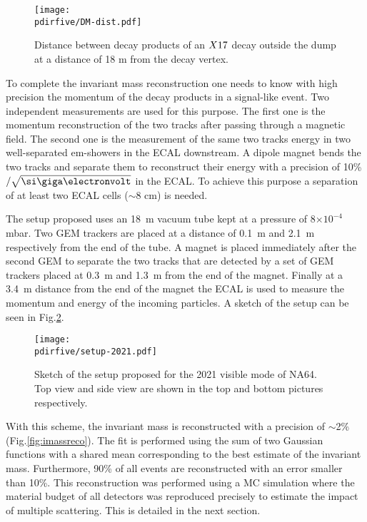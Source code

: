 \begin{figure}[tbh!]
  \centering
  \texttt{[image: \\pdirfive/DM-dist.pdf]}
  \caption[Distance of the decay products of X17 in the 2021 setup]{Distance between decay products of an $X17$ decay outside the dump at a distance of 18 m from the decay vertex.}
  \label{fig:dm_dist1}
\end{figure}

To complete the invariant mass reconstruction one needs to know with high precision the momentum of the decay products in a signal-like event. Two independent measurements are used for this purpose. The first one is the momentum reconstruction of the two tracks after passing through a magnetic field. The second one is the measurement of the same two tracks energy in two well-separated em-showers in the ECAL downstream. A dipole magnet bends the two tracks and separate them to reconstruct their energy with a precision of 10\%$/\sqrt{\gev}$ in the ECAL. To achieve this purpose a separation of at least two ECAL cells ($\sim 8$ \si{\centi\meter}) is needed.

The setup proposed uses an \SI{18}{\meter} vacuum tube kept at a pressure of 8$\times 10^{-4}$ \si{\milli\bar}. Two GEM trackers \cite{gem} are placed at a distance of \SI{0.1}{\meter} and \SI{2.1}{\meter} respectively from the end of the tube. A magnet is placed immediately after the second GEM to separate the two tracks that are detected by a set of GEM trackers placed at \SI{0.3}{\meter} and \SI{1.3}{\meter} from the end of the magnet. Finally at a \SI{3.4}{\meter} distance from the end of the magnet the ECAL is used to measure the momentum and energy of the incoming particles. A sketch of the setup can be seen in Fig.\ref{fig:setup-2021}.

\begin{figure}[tbh!]
  \centering
  \texttt{[image: \\pdirfive/setup-2021.pdf]}
  \caption[2021 setup]{Sketch of the setup proposed for the 2021 visible mode of NA64. Top view and side view are shown in the top and bottom pictures respectively.}
  \label{fig:setup-2021}
\end{figure}

With this scheme, the invariant mass is reconstructed with a precision of $\sim$2\% (Fig.\ref{fig:imassreco}). The fit is performed using the sum of two Gaussian functions with a shared mean corresponding to the best estimate of the invariant mass. Furthermore, 90\% of all events are reconstructed with an error smaller than 10\%. This reconstruction was performed using a MC simulation where the material budget of all detectors was reproduced precisely to estimate the impact of multiple scattering. This is detailed in the next section.


